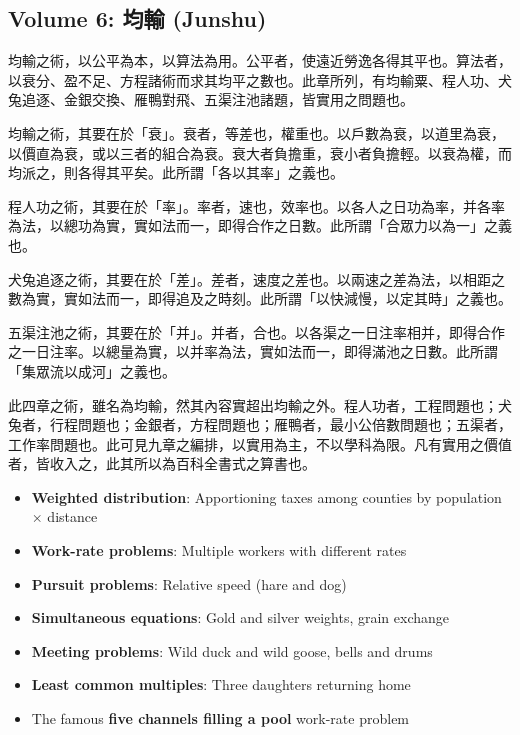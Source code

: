 \documentclass[11pt,a4paper]{article}
\newcommand{\zh}[1]{#1}
\begin{document}
\subsection*{Volume 6: \zh{均輸} (Junshu)}

\begin{commentary}[\zh{劉徽注·均輸章總論}]
\zh{%
均輸之術，以公平為本，以算法為用。公平者，使遠近勞逸各得其平也。算法者，以衰分、盈不足、方程諸術而求其均平之數也。此章所列，有均輸粟、程人功、犬兔追逐、金銀交換、雁鴨對飛、五渠注池諸題，皆實用之問題也。

均輸之術，其要在於「衰」。衰者，等差也，權重也。以戶數為衰，以道里為衰，以價直為衰，或以三者的組合為衰。衰大者負擔重，衰小者負擔輕。以衰為權，而均派之，則各得其平矣。此所謂「各以其率」之義也。

程人功之術，其要在於「率」。率者，速也，效率也。以各人之日功為率，并各率為法，以總功為實，實如法而一，即得合作之日數。此所謂「合眾力以為一」之義也。

犬兔追逐之術，其要在於「差」。差者，速度之差也。以兩速之差為法，以相距之數為實，實如法而一，即得追及之時刻。此所謂「以快減慢，以定其時」之義也。

五渠注池之術，其要在於「并」。并者，合也。以各渠之一日注率相并，即得合作之一日注率。以總量為實，以并率為法，實如法而一，即得滿池之日數。此所謂「集眾流以成河」之義也。

此四章之術，雖名為均輸，然其內容實超出均輸之外。程人功者，工程問題也；犬兔者，行程問題也；金銀者，方程問題也；雁鴨者，最小公倍數問題也；五渠者，工作率問題也。此可見九章之編排，以實用為主，不以學科為限。凡有實用之價值者，皆收入之，此其所以為百科全書式之算書也。
}
\end{commentary}

\begin{itemize}[leftmargin=2em]
  \item \textbf{Weighted distribution}: Apportioning taxes among counties by population $\times$ distance
  \item \textbf{Work-rate problems}: Multiple workers with different rates
  \item \textbf{Pursuit problems}: Relative speed (hare and dog)
  \item \textbf{Simultaneous equations}: Gold and silver weights, grain exchange
  \item \textbf{Meeting problems}: Wild duck and wild goose, bells and drums
  \item \textbf{Least common multiples}: Three daughters returning home
  \item The famous \textbf{five channels filling a pool} work-rate problem
\end{itemize}
\end{document}
